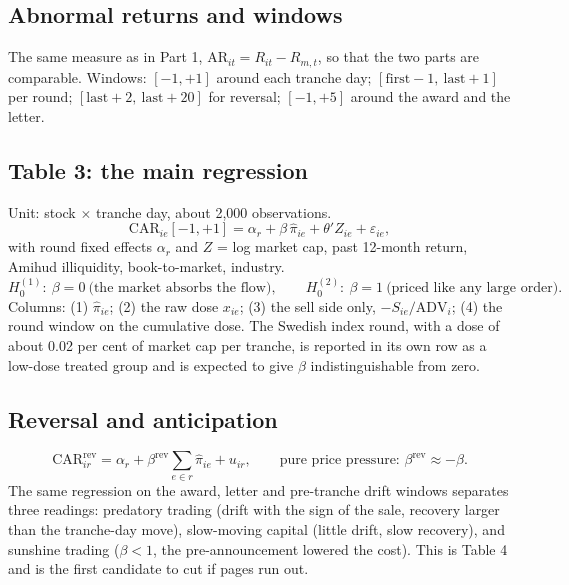 \documentclass[11pt,a4paper]{article}
\newcommand{\ADV}{\mathrm{ADV}}
\newcommand{\CAR}{\mathrm{CAR}}
\newcommand{\AR}{\mathrm{AR}}
\begin{document}
\subsection{Abnormal returns and windows}
The same measure as in Part 1, $\AR_{it} = R_{it} - R_{m,t}$, so that the two parts are comparable. Windows: $[-1,+1]$ around each tranche day; $[\text{first}-1,\ \text{last}+1]$ per round; $[\text{last}+2,\ \text{last}+20]$ for reversal; $[-1,+5]$ around the award and the letter.

\subsection{Table 3: the main regression}
Unit: stock $\times$ tranche day, about 2,000 observations.
\begin{equation}
\CAR_{ie}[-1,+1] = \alpha_r + \beta\,\hat\pi_{ie} + \theta' Z_{ie} + \varepsilon_{ie},
\end{equation}
with round fixed effects $\alpha_r$ and $Z$ = log market cap, past 12-month return, Amihud illiquidity, book-to-market, industry.
\begin{equation}
H_0^{(1)}:\ \beta = 0 \ \text{(the market absorbs the flow)}, \qquad H_0^{(2)}:\ \beta = 1 \ \text{(priced like any large order)}.
\end{equation}
Columns: (1) $\hat\pi_{ie}$; (2) the raw dose $x_{ie}$; (3) the sell side only, $-S_{ie}/\ADV_i$; (4) the round window on the cumulative dose. The Swedish index round, with a dose of about 0.02 per cent of market cap per tranche, is reported in its own row as a low-dose treated group and is expected to give $\beta$ indistinguishable from zero.

\subsection{Reversal and anticipation}
\begin{equation}
\CAR^{\text{rev}}_{ir} = \alpha_r + \beta^{\text{rev}}\sum_{e\in r}\hat\pi_{ie} + u_{ir}, \qquad \text{pure price pressure: } \beta^{\text{rev}} \approx -\beta.
\end{equation}
The same regression on the award, letter and pre-tranche drift windows separates three readings: predatory trading (drift with the sign of the sale, recovery larger than the tranche-day move), slow-moving capital (little drift, slow recovery), and sunshine trading ($\beta<1$, the pre-announcement lowered the cost). This is Table 4 and is the first candidate to cut if pages run out.
\end{document}
